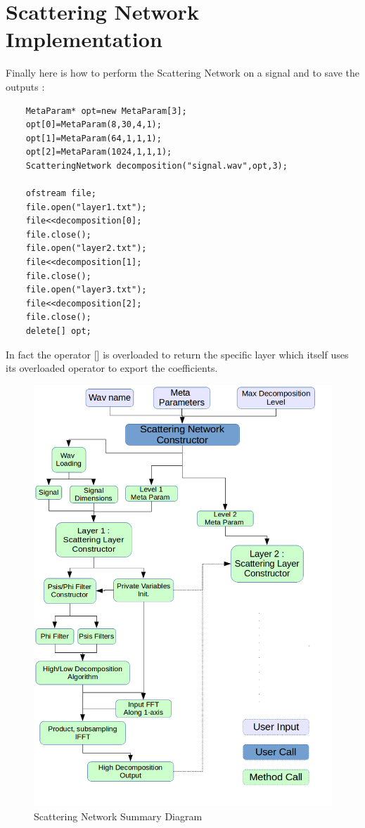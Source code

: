 \documentclass[a4paper]{report}
\begin{document}
\section{Scattering Network Implementation}
Finally here is how to perform the Scattering Network on a signal and to save the outputs :
\begin{lstlisting}
    MetaParam* opt=new MetaParam[3];
    opt[0]=MetaParam(8,30,4,1);
    opt[1]=MetaParam(64,1,1,1);
    opt[2]=MetaParam(1024,1,1,1);
    ScatteringNetwork decomposition("signal.wav",opt,3);

    ofstream file;
    file.open("layer1.txt");
    file<<decomposition[0];
    file.close();
    file.open("layer2.txt");
    file<<decomposition[1];
    file.close();
    file.open("layer3.txt");
    file<<decomposition[2];
    file.close();
    delete[] opt;
\end{lstlisting}
In fact the operator [] is overloaded to return the specific layer which itself uses its overloaded operator to export the coefficients.
\begin{figure}[H]
\begin{center}
\includegraphics[scale=0.38]{scatteering_diagram.png}\caption{Scattering Network Summary Diagram}
\end{center}
\end{figure}
\end{document}
